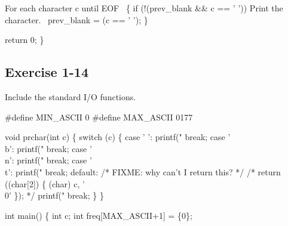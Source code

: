     \LA{}For each character \code{}c\edoc{} until \code{}EOF\edoc{}~{\nwtagstyle{}}\RA{} \{
        if (!(prev_blank && c == ' '))
            \LA{}Print the character.~{\nwtagstyle{}}\RA{}
        prev_blank = (c == ' ');
    \}


    return 0;
\}
\nwendcode{}\nwdocspar
\nwenddocs{}\subsection{Exercise 1-14}

\nwenddocs{}\endmoddef{}
\LA{}Include the standard I/O functions.~{\nwtagstyle{}}\RA{}


#define MIN_ASCII 0
#define MAX_ASCII 0177


\nwendcode{}\nwdocspar

\nwenddocs{}\plusendmoddef
void prchar(int c)
\{
    switch (c) \{
        case ' ':
            printf("%
            break;
        case '\\b':
            printf("%
            break;
        case '\\n':
            printf("%
            break;
        case '\\t':
            printf("%
            break;
        default:
            /* FIXME: why can't I return this? */
            /* return ((char[2]) \{ (char) c, '\\0' \}); */
            printf("%
            break;
    \}
\}


\eatline
{}\nwendcode{}\nwdocspar
\nwenddocs{}\plusendmoddef
int main()
\{
    int c;
    int freq[MAX_ASCII+1] = \{0\};

